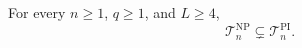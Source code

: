 For every \(n\geq1\), \(q\geq1\), and \(L\geq4\),
\[
 \mathcal T_n^{\mathrm{NP}}\subsetneq\mathcal T_n^{\mathrm{PI}}.
\]